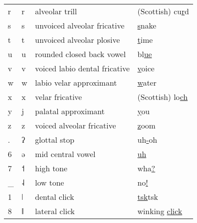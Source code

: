 \begin{table}
\begin{tabular}{llll}
r & {\uni{} r} & alveolar trill& (Scottish) cu\underline{r}d\\
s & {\uni{} s} & unvoiced alveolar fricative & \underline{s}nake\\
t & {\uni{} t} & unvoiced alveolar plosive & \underline{t}ime \\
u & {\uni{} u} & rounded closed back vowel & bl\underline{ue}\\
v & {\uni{} v} & voiced labio dental fricative & \underline{v}oice\\
w & {\uni{} w} & labio velar approximant & \underline{w}ater\\
x & {\uni{} x} & velar fricative& (Scottish) lo\underline{ch}\\
y & {\uni{} j} & palatal approximant & \underline{y}ou\\
z & {\uni{} z} & voiced alveolar fricative & \underline{z}oom\\
\@. & {\uni{} ʔ} & glottal stop & uh\underline{-}oh\\
6 & {\uni{} ə} & mid central vowel&\underline{uh}\\
7 & {\uni{} ˦} & high tone& wha\underline{?}\\
\_ & {\uni{} ˨} & low tone& no\underline{!}\\
1 & {\uni{} ǀ} & dental click & \underline{tsk}tsk\\
8 & {\uni{} ǁ} & lateral click & winking \underline{click} \\
\end{tabular}
\label{phonology}
\end{table}

